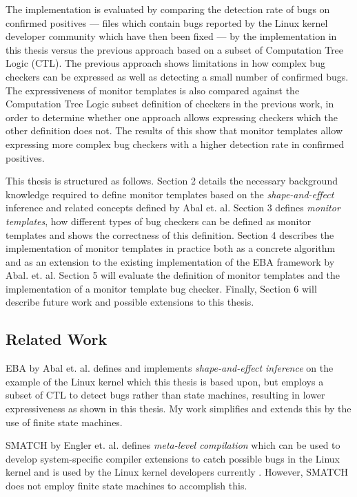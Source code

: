 \newpar The implementation is evaluated by comparing the detection rate of bugs on confirmed positives --- files which contain bugs reported by the Linux kernel developer community which have then been fixed --- by the implementation in this thesis versus the previous approach based on a subset of Computation Tree Logic (CTL). The previous approach shows limitations in how complex bug checkers can be expressed as well as detecting a small number of confirmed bugs. The expressiveness of monitor templates is also compared against the Computation Tree Logic subset definition of checkers in the previous work, in order to determine whether one approach allows expressing checkers which the other definition does not. The results of this show that monitor templates allow expressing more complex bug checkers with a higher detection rate in confirmed positives.   

\newpar This thesis is structured as follows. Section 2 details the necessary background knowledge required to define monitor templates based on the \textit{shape-and-effect} inference and related concepts defined by Abal et. al. Section 3 defines \textit{monitor templates}, how different types of bug checkers can be defined as monitor templates and shows the correctness of this definition. Section 4 describes the implementation of monitor templates in practice both as a concrete algorithm and as an extension to the existing implementation of the EBA framework by Abal. et. al. Section 5 will evaluate the definition of monitor templates and the implementation of a monitor template bug checker. Finally, Section 6 will describe future work and possible extensions to this thesis.    

\subsection{Related Work}
EBA by Abal et. al. defines and implements \textit{shape-and-effect inference} on the example of the Linux kernel \cite{Abal2017EffectiveBF} which this thesis is based upon, but employs a subset of CTL to detect bugs rather than state machines, resulting in lower expressiveness as shown in this thesis. My work simplifies and extends this by the use of finite state machines. 

\newpar SMATCH by Engler et. al. defines \textit{meta-level compilation} which can be used to develop system-specific compiler extensions to catch possible bugs in the Linux kernel and is used by the Linux kernel developers currently \cite{smatch}. However, SMATCH does not employ finite state machines to accomplish this. 


